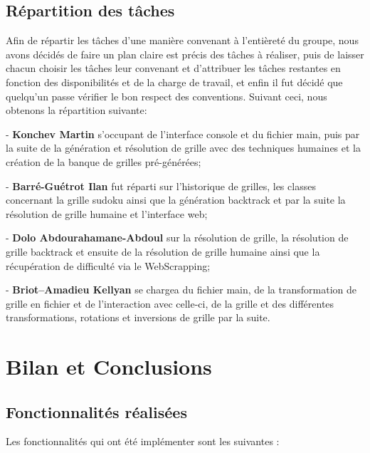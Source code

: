 \documentclass[a4paper]{article}
\begin{document}
\subsection{Répartition des tâches}
Afin de répartir les tâches d'une manière convenant à l'entièreté du groupe, nous avons décidés de faire un plan claire est précis des tâches à réaliser, puis de laisser chacun choisir les tâches leur convenant et d'attribuer les tâches restantes en fonction des disponibilités et de la charge de travail, et enfin il fut décidé que quelqu'un passe vérifier le bon respect des conventions. Suivant ceci, nous obtenons la répartition suivante:
	
- \textbf{Konchev Martin} s'occupant de l'interface console et du fichier main, puis par la suite de la génération et résolution de grille avec des techniques humaines et la création de la banque de grilles pré-générées;

- \textbf{Barré-Guétrot Ilan} fut réparti sur l'historique de grilles, les classes concernant la grille sudoku ainsi que la génération backtrack et par la suite la résolution de grille humaine et l'interface web;

- \textbf{Dolo Abdourahamane-Abdoul} sur la résolution de grille, la résolution de grille backtrack et ensuite de la résolution de grille humaine ainsi que la récupération de difficulté via le WebScrapping;

- \textbf{Briot--Amadieu Kellyan} se chargea du fichier main, de la transformation de grille en fichier et de l'interaction avec celle-ci, de la grille et des différentes transformations, rotations et inversions de grille par la suite.



\vspace{0.5cm}

\section{Bilan et Conclusions}

\subsection{Fonctionnalités réalisées}
Les fonctionnalités qui ont été implémenter sont les suivantes :
    
\end{document}
